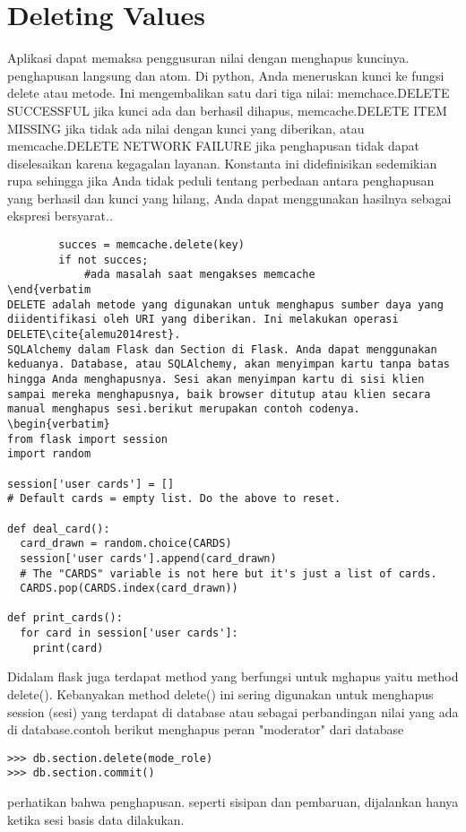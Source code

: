 \section{Deleting Values}
Aplikasi dapat memaksa penggusuran nilai dengan menghapus kuncinya. penghapusan langsung dan atom.
Di python, Anda meneruskan kunci ke fungsi delete atau metode. Ini mengembalikan satu dari tiga nilai: memchace.DELETE SUCCESSFUL jika kunci ada dan berhasil dihapus, memcache.DELETE ITEM MISSING jika tidak ada nilai dengan kunci yang diberikan, atau memcache.DELETE NETWORK FAILURE jika penghapusan tidak dapat diselesaikan karena kegagalan layanan. Konstanta ini didefinisikan sedemikian rupa sehingga jika Anda tidak peduli tentang perbedaan antara penghapusan yang berhasil dan kunci yang hilang, Anda dapat menggunakan hasilnya sebagai ekspresi bersyarat.\cite{sanderson2015programming}.
\begin{verbatim}
		succes = memcache.delete(key)
		if not succes;
			#ada masalah saat mengakses memcache
\end{verbatim
DELETE adalah metode yang digunakan untuk menghapus sumber daya yang diidentifikasi oleh URI yang diberikan. Ini melakukan operasi DELETE\cite{alemu2014rest}.
SQLAlchemy dalam Flask dan Section di Flask. Anda dapat menggunakan keduanya. Database, atau SQLAlchemy, akan menyimpan kartu tanpa batas hingga Anda menghapusnya. Sesi akan menyimpan kartu di sisi klien sampai mereka menghapusnya, baik browser ditutup atau klien secara manual menghapus sesi.berikut merupakan contoh codenya.
\begin{verbatim}
from flask import session
import random

session['user cards'] = []
# Default cards = empty list. Do the above to reset.

def deal_card():
  card_drawn = random.choice(CARDS)
  session['user cards'].append(card_drawn)
  # The "CARDS" variable is not here but it's just a list of cards.
  CARDS.pop(CARDS.index(card_drawn))

def print_cards():
  for card in session['user cards']:
    print(card)
\end{verbatim}

Didalam flask juga terdapat method yang berfungsi untuk mghapus yaitu method delete(). Kebanyakan method delete() ini sering digunakan untuk menghapus session (sesi) yang terdapat di database atau sebagai perbandingan nilai yang ada di database.contoh berikut menghapus peran "moderator" dari database
\begin{verbatim}
>>> db.section.delete(mode_role)
>>> db.section.commit()
\end{verbatim}
perhatikan bahwa penghapusan. seperti sisipan dan pembaruan, dijalankan hanya ketika sesi basis data dilakukan\cite{grinberg2018flask}.

